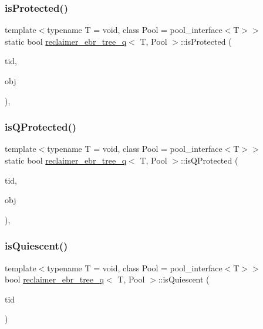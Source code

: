 \subsubsection{\texorpdfstring{is\+Protected()}{isProtected()}}
{\footnotesize\ttfamily template$<$typename T  = void, class Pool  = pool\+\_\+interface$<$\+T$>$$>$ \\
static bool \hyperlink{classreclaimer__ebr__tree__q}{reclaimer\+\_\+ebr\+\_\+tree\+\_\+q}$<$ T, Pool $>$\+::is\+Protected (\begin{DoxyParamCaption}\item[{const int}]{tid,  }\item[{T $\ast$const}]{obj }\end{DoxyParamCaption})\hspace{0.3cm}{\ttfamily [inline]}, {\ttfamily [static]}}

\mbox{\label{classreclaimer__ebr__tree__q_aaac58c40bba2197b60831238535a8f73}} 
\subsubsection{\texorpdfstring{is\+Q\+Protected()}{isQProtected()}}
{\footnotesize\ttfamily template$<$typename T  = void, class Pool  = pool\+\_\+interface$<$\+T$>$$>$ \\
static bool \hyperlink{classreclaimer__ebr__tree__q}{reclaimer\+\_\+ebr\+\_\+tree\+\_\+q}$<$ T, Pool $>$\+::is\+Q\+Protected (\begin{DoxyParamCaption}\item[{const int}]{tid,  }\item[{T $\ast$const}]{obj }\end{DoxyParamCaption})\hspace{0.3cm}{\ttfamily [inline]}, {\ttfamily [static]}}

\mbox{\label{classreclaimer__ebr__tree__q_acf02fbff03a0e5fff1e98b6457d77c20}} 
\subsubsection{\texorpdfstring{is\+Quiescent()}{isQuiescent()}}
{\footnotesize\ttfamily template$<$typename T  = void, class Pool  = pool\+\_\+interface$<$\+T$>$$>$ \\
bool \hyperlink{classreclaimer__ebr__tree__q}{reclaimer\+\_\+ebr\+\_\+tree\+\_\+q}$<$ T, Pool $>$\+::is\+Quiescent (\begin{DoxyParamCaption}\item[{const int}]{tid }\end{DoxyParamCaption})\hspace{0.3cm}{\ttfamily [inline]}}

